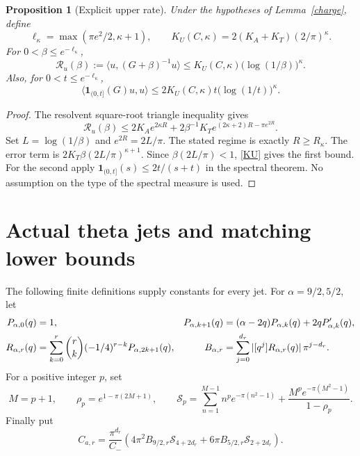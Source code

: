 \documentclass[11pt]{article}
\newtheorem{proposition}[theorem]{Proposition}
\theoremstyle{remark}
\begin{document}
\begin{proposition}[Explicit upper rate]\label{upper}
Under the hypotheses of Lemma~\ref{charge}, define
\begin{equation}\label{KU}
 \ell_\kappa=\max(\pi e^2/2,\kappa+1),\qquad
 K_U(C,\kappa)=2(K_A+K_T)(2/\pi)^\kappa.
\end{equation}
For \(0<\beta\le e^{-\ell_\kappa}\),
\[
 \mathcal R_u(\beta):=\langle u,(G+\beta)^{-1}u\rangle
       \le K_U(C,\kappa)\bigl(\log(1/\beta)\bigr)^\kappa.
\]
Also, for \(0<t\le e^{-\ell_\kappa}\),
\[
 \langle\mathbf1_{(0,t]}(G)u,u\rangle
       \le2K_U(C,\kappa)t\bigl(\log(1/t)\bigr)^\kappa.
\]
\end{proposition}
\begin{proof}
The resolvent square-root triangle inequality gives
\[
 \mathcal R_u(\beta)\le
 2K_Ae^{2\kappa R}
       +2\beta^{-1}K_Te^{(2\kappa+2)R-\pi e^{2R}}.
\]
Set \(L=\log(1/\beta)\) and \(e^{2R}=2L/\pi\).
The stated regime is exactly \(R\ge R_\kappa\).
The error term is \(2K_T\beta(2L/\pi)^{\kappa+1}\).
Since \(\beta(2L/\pi)<1\), \eqref{KU} gives the first bound.
For the second apply
\(\mathbf1_{(0,t]}(s)\le2t/(s+t)\) in the spectral theorem.
No assumption on the type of the spectral measure is used.
\end{proof}

\section{Actual theta jets and matching lower bounds}

The following finite definitions supply constants for every jet.
For \(\alpha=9/2,5/2\), let
\begin{align}
 P_{\alpha,0}(q)&=1,&
 P_{\alpha,k+1}(q)&=(\alpha-2q)P_{\alpha,k}(q)
                                      +2qP'_{\alpha,k}(q),\notag\\
 R_{\alpha,r}(q)&=\sum_{k=0}^r\binom rk(-1/4)^{r-k}
                                  P_{\alpha,2k+1}(q),&
 B_{\alpha,r}&=\sum_{j=0}^{d_r}
          |[q^j]R_{\alpha,r}(q)|\,\pi^{j-d_r}.\label{polynomials}
\end{align}
For a positive integer \(p\), set
\begin{equation}\label{Sp}
 M=p+1,\qquad \rho_p=e^{1-\pi(2M+1)},\qquad
 \mathcal S_p=\sum_{n=1}^{M-1}n^pe^{-\pi(n^2-1)}
      +\frac{M^pe^{-\pi(M^2-1)}}{1-\rho_p}.
\end{equation}
Finally put
\begin{equation}\label{Ca}
 C_{a,r}=\frac{\pi^{d_r}}{C_-}
 \left(4\pi^2B_{9/2,r}\mathcal S_{4+2d_r}
              +6\pi B_{5/2,r}\mathcal S_{2+2d_r}\right).
\end{equation}
\end{document}
